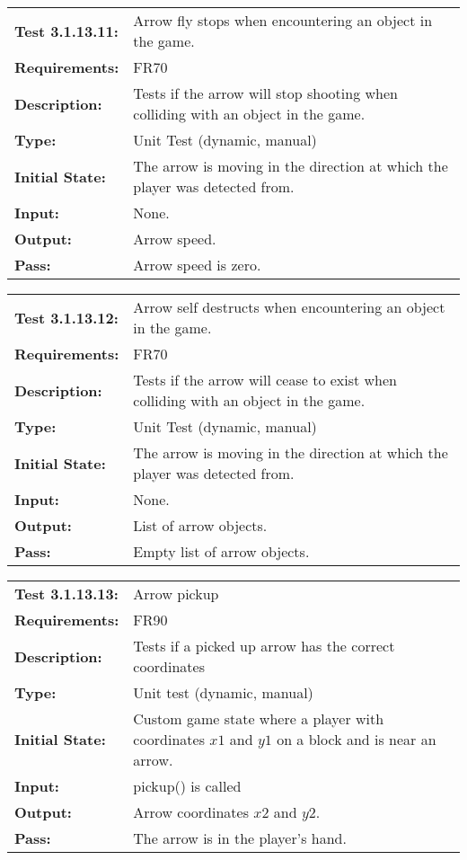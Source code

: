 \documentclass[12pt, titlepage]{article}
\begin{document}
\begin{tabular}{|l|p{10cm}|}
    \hline
    \bf{Test} 3.1.13.11: & Arrow fly stops when encountering an object in the game.\\
    \bf{Requirements}: & FR70\\
    \bf{Description}: & Tests if the arrow will stop shooting when colliding with an object in the game. \\
    \bf{Type}: & Unit Test (dynamic, manual) \\
    \bf{Initial State}: & The arrow is moving in the direction at which the player was detected from. \\
    \bf{Input}: & None.\\
    \bf{Output}: & Arrow speed.\\
    \bf{Pass}: & Arrow speed is zero.\\
    \hline
\end{tabular}

\begin{tabular}{|l|p{10cm}|}
    \hline
    \bf{Test} 3.1.13.12: & Arrow self destructs when encountering an object in the game.\\
    \bf{Requirements}: & FR70\\
    \bf{Description}: & Tests if the arrow will cease to exist when colliding with an object in the game. \\
    \bf{Type}: & Unit Test (dynamic, manual) \\
    \bf{Initial State}: & The arrow is moving in the direction at which the player was detected from. \\
    \bf{Input}: & None.\\
    \bf{Output}: & List of arrow objects.\\
    \bf{Pass}: & Empty list of arrow objects.\\
    \hline
\end{tabular}

\textcolor{red}{
\begin{tabular}{|l|p{10cm}|}
    \hline
    \bf{Test} 3.1.13.13: & Arrow pickup \\
    \bf{Requirements}: & FR90 \\
    \bf{Description}: &  Tests if a picked up arrow has the correct coordinates \\
    \bf{Type}: & Unit test (dynamic, manual) \\
    \bf{Initial State}: & Custom game state where a player with coordinates $x1$ and $y1$ on a block and is near an arrow. \\
    \bf{Input}: & pickup() is called \\
    \bf{Output}: & Arrow coordinates $x2$ and $y2$. \\
    \bf{Pass}: & The arrow is in the player's hand. \\
    \hline
\end{tabular}
}
\end{document}
